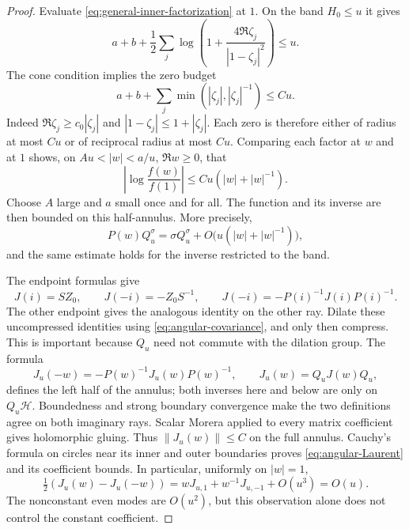 \begin{proof}
Evaluate \eqref{eq:general-inner-factorization} at $1$.  On the band
$H_0\le u$ it gives
\[
 a+b+\frac12\sum_j
 \log\left(1+\frac{4\Re\zeta_j}{|1-\zeta_j|^2}\right)\le u.
\]
The cone condition implies the zero budget
\begin{equation}\label{eq:angular-zero-budget}
 a+b+\sum_j\min(|\zeta_j|,|\zeta_j|^{-1})\le Cu.
\end{equation}
Indeed $\Re\zeta_j\ge c_0|\zeta_j|$ and
$|1-\zeta_j|\le1+|\zeta_j|$.  Each zero is therefore either of
radius at most $Cu$ or of reciprocal radius at most $Cu$.
Comparing each factor at $w$ and at $1$ shows, on
$Au<|w|<a/u$, $\Re w\ge0$, that
\[
 \left|\log\frac{f(w)}{f(1)}\right|
 \le Cu(|w|+|w|^{-1}).
\]
Choose $A$ large and $a$ small once and for all.  The function and its
inverse are then bounded on this half-annulus.  More precisely,
\begin{equation}\label{eq:angular-band-sign}
 P(w)Q_u^\sigma=\sigma Q_u^\sigma
       +O\bigl(u(|w|+|w|^{-1})\bigr),
\end{equation}
and the same estimate holds for the inverse restricted to the band.

The endpoint formulas give
\[
 J(i)=SZ_0,\qquad J(-i)=-Z_0S^{-1},\qquad
 J(-i)=-P(i)^{-1}J(i)P(i)^{-1}.
\]
The other endpoint gives the analogous identity on the other ray.
Dilate these uncompressed identities using
\eqref{eq:angular-covariance}, and only then compress.  This is
important because $Q_u$ need not commute with the dilation group.
The formula
\begin{equation}\label{eq:angular-current-gluing}
 J_u(-w)=-P(w)^{-1}J_u(w)P(w)^{-1},\qquad
 J_u(w)=Q_uJ(w)Q_u,
\end{equation}
defines the left half of the annulus; both inverses here and below are
only on $Q_u\mathcal H$.  Boundedness and strong boundary convergence
make the two definitions agree on both imaginary rays.  Scalar Morera
applied to every matrix coefficient gives holomorphic gluing.  Thus
$\|J_u(w)\|\le C$ on the full annulus.  Cauchy's formula on circles
near its inner and outer boundaries proves
\eqref{eq:angular-Laurent} and its coefficient bounds.  In particular,
uniformly on $|w|=1$,
\begin{equation}\label{eq:angular-odd-expansion}
 \tfrac12(J_u(w)-J_u(-w))
 =wJ_{u,1}+w^{-1}J_{u,-1}+O(u^3)=O(u).
\end{equation}
The nonconstant even modes are $O(u^2)$, but this observation alone
does not control the constant coefficient.


\end{proof}
